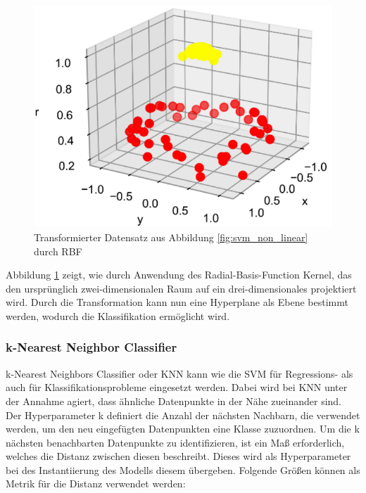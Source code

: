 \begin{figure}[h]
    \centering
    \includegraphics[scale=0.5]{figures/svm_kernel_transformation.png}
    \caption{Transformierter Datensatz aus Abbildung \ref{fig:svm_non_linear} durch RBF}
    \label{fig:svm_transformed}
\end{figure}

Abbildung \ref{fig:svm_transformed} zeigt, wie durch Anwendung des Radial-Basis-Function Kernel, das den ursprünglich zwei-dimensionalen Raum auf ein drei-dimensionales projektiert wird.
Durch die Transformation kann nun eine Hyperplane als Ebene bestimmt werden, wodurch die Klassifikation ermöglicht wird.

\pagebreak

\subsubsection*{k-Nearest Neighbor Classifier}

k-Nearest Neighbors Classifier oder KNN kann wie die SVM für Regressions- als auch für Klassifikationsprobleme eingesetzt werden. Dabei wird bei KNN unter der Annahme agiert, dass ähnliche Datenpunkte in der Nähe zueinander sind.
Der Hyperparameter k definiert die Anzahl der nächsten Nachbarn, die verwendet werden, um den neu eingefügten Datenpunkten eine Klasse zuzuordnen. Um die k nächsten benachbarten Datenpunkte zu identifizieren, ist ein Maß erforderlich, welches die Distanz zwischen diesen beschreibt. Dieses wird als Hyperparameter bei des Instantiierung des Modells diesem übergeben.
Folgende Größen können als Metrik für die Distanz verwendet werden:


